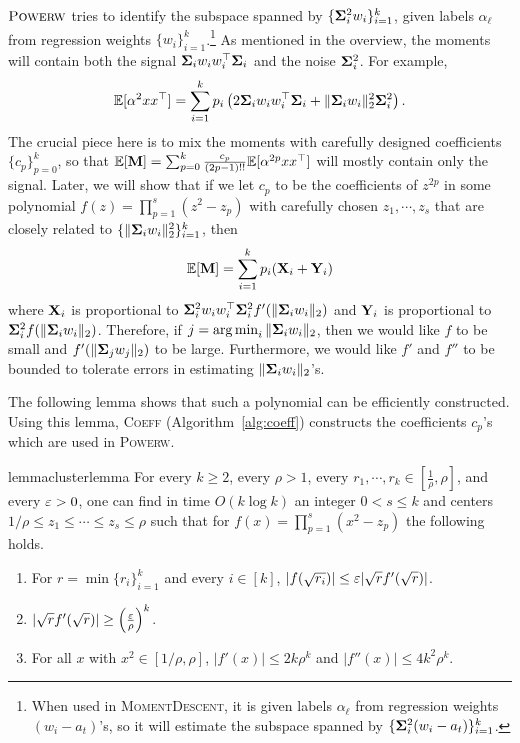 $\textsc{Powerw}$ tries to identify the subspace spanned by $\{\bold{\Sigma}_i^2 w_i\}_{i=1}^k$, given labels $\alpha_\ell$ from regression weights $\{w_i\}_{i=1}^k$.\footnote{When used in \textsc{MomentDescent}, it is given labels $\alpha_\ell$ from regression weights $(w_i - a_t)$'s, so it will estimate the subspace spanned by $\{\bold{\Sigma}_i^2 (w_i - a_t)\}_{i=1}^k$.}
As mentioned in the overview, the moments will contain both the signal $\bold{\Sigma}_i w_i w_i^{\top} \bold{\Sigma}_i$ and the noise $\bold{\Sigma}_i^2 $. For example,
\begin{align*} 
\mathbb{E}[\alpha^2 x x^{\top}] = \sum_{i = 1}^k p_i     \left( 2\bold{\Sigma}_i w_i w_i^{\top} \bold{\Sigma}_i + \| \bold{\Sigma}_i w_i \|_2^2 \bold{\Sigma}_i^2  \right).
\end{align*}
The crucial piece here is to mix the moments with carefully designed coefficients $\{c_p\}_{p=0}^k$, so that $\mathbb{E}[\bold{M}] = \sum_{p = 0}^k \frac{c_p}{(2p - 1)!!} \mathbb{E}[\alpha^{2p} x x^{\top}]$ will mostly contain only the signal.
Later, we will show that if we let $c_p$ to be the coefficients of $z^{2p}$ in some polynomial $f(z) = \prod_{p = 1}^s (z^2 - z_p)$ with carefully chosen $z_1, \cdots, z_s$ that are closely related to $\{ \| \bold{\Sigma}_i w_i\|_2^2\}_{i = 1}^k$, then 
$$
 \mathbb{E}[\bold{M}] = \sum_{i=1}^k p_i (\bold{X}_i + \bold{Y}_i)
$$
where $ \bold{X}_i$ is proportional to $\bold{\Sigma}_i^2 w_i w_i^{\top} \bold{\Sigma}_i^2  f'( \| \bold{\Sigma}_i w_i\|_2)$ and $\bold{Y}_i$ is proportional to $\bold{\Sigma}_i^2 f(\| \bold{\Sigma}_i w_i \|_2)$.
Therefore, if $j = \operatorname*{arg\,min}_i \| \bold{\Sigma}_i w_i \|_2$, then we would like $f$ to be small and $f'( \| \bold{\Sigma}_j w_j\|_2)$ to be large. Furthermore, we would like $f'$ and $f''$ to be bounded to tolerate errors in estimating $\| \bold{\Sigma}_i w_i \|_2$'s. 

The following lemma shows that such a polynomial can be efficiently constructed. Using this lemma, \textsc{Coeff} (Algorithm~\ref{alg:coeff}) constructs the coefficients $c_p$'s which are used in \textsc{Powerw}. 

\begin{restatable}[Coefficients]{lemma}{clusterlemma}\label{lem:cluster}
For every $k \geq 2$, every $\rho > 1$, every $r_1, \cdots, r_k \in [\frac{1}{\rho}, \rho]$, and every $\varepsilon > 0$, one can find in time $O(k\log k)$ an integer $0<s\le k$ and centers $1/\rho \leq z_1 \leq  \cdots \leq z_s \leq \rho$ such that for $f(x) = \prod_{p = 1}^s (x^2 - z_p)$ the following holds.
\begin{enumerate}
\item For $r = \min\{r_i\}_{i = 1}^k$ and every $i \in [k]$, $|f(\sqrt{r_i})| \leq \varepsilon |\sqrt{r}f'(\sqrt{r}) |  $. 
\item $|\sqrt{r}f'(\sqrt{r})| \geq  \left( \frac{ \varepsilon}{\rho} \right)^k$. 
\item For all $x$ with $x^2\in [1/\rho, \rho]$, $|f'(x)| \leq 2k \rho^k$ and $|f''(x)| \leq 4k^2 \rho^k$.
\end{enumerate}
\end{restatable}

